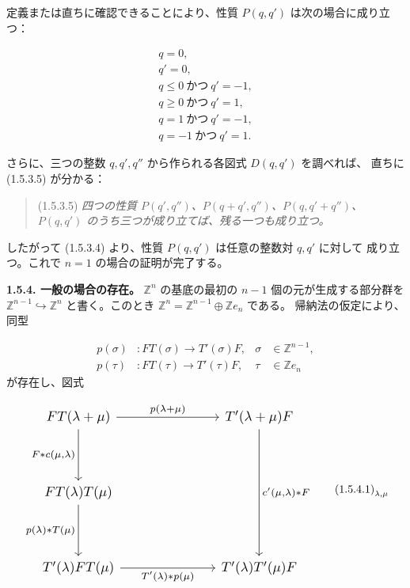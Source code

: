 \clearpage
{}%
定義または直ちに確認できることにより、性質 $P(q,q')$ は次の場合に成り立つ：

\begin{equation}
  \begin{gathered}
    q=0,\\
    q'=0,\\
    q\leq 0\ \text{かつ}\ q'=-1,\\
    q\geq 0\ \text{かつ}\ q'=1,\\
    q=1\ \text{かつ}\ q'=-1,\\
    q=-1\ \text{かつ}\ q'=1.
  \end{gathered}
  \tag{1.5.3.4}
\end{equation}

さらに、三つの整数 $q,q',q''$ から作られる各図式 $D(q,q')$ を調べれば、
直ちに (1.5.3.5) が分かる：

\begin{quote}
  \noindent\textup{(1.5.3.5)}\quad
  \emph{四つの性質
  $P(q',q'')$、$P(q+q',q'')$、$P(q,q'+q'')$、$P(q,q')$
  のうち三つが成り立てば、残る一つも成り立つ。}
\end{quote}

したがって (1.5.3.4) より、性質 $P(q,q')$ は任意の整数対 $q,q'$ に対して
成り立つ。これで $n=1$ の場合の証明が完了する。

\noindent\textbf{1.5.4. 一般の場合の存在。}\quad
$\mathbb Z^n$ の基底の最初の $n-1$ 個の元が生成する部分群を
$\mathbb Z^{n-1}\hookrightarrow\mathbb Z^n$ と書く。このとき
$\mathbb Z^n=\mathbb Z^{n-1}\oplus\mathbb Z e_n$ である。
帰納法の仮定により、同型

\[
  \begin{aligned}
    p(\sigma)&\colon FT(\sigma)\longrightarrow T'(\sigma)F,
      &\sigma&\in\mathbb Z^{n-1},\\
    p(\tau)&\colon FT(\tau)\longrightarrow T'(\tau)F,
      &\tau&\in\mathbb Z e_n
  \end{aligned}
\]
が存在し、図式

\begin{equation}
  \resizebox{0.76\textwidth}{!}{%
    $\begin{tikzcd}[ampersand replacement=\&,column sep=7.0em,row sep=3.8em]
      FT(\lambda+\mu)
        \arrow[r,"{p(\lambda+\mu)}"]
        \arrow[d,"{F*c(\mu,\lambda)}"']
        \& T'(\lambda+\mu)F
        \arrow[dd,"{c'(\mu,\lambda)*F}"] \\
      FT(\lambda)T(\mu)
        \arrow[d,"{p(\lambda)*T(\mu)}"']
        \& {} \\
      T'(\lambda)FT(\mu)
        \arrow[r,"{T'(\lambda)*p(\mu)}"']
        \& T'(\lambda)T'(\mu)F
    \end{tikzcd}$%
  }
  \tag*{\(\textup{(1.5.4.1)}_{\lambda,\mu}\)}
\end{equation}
